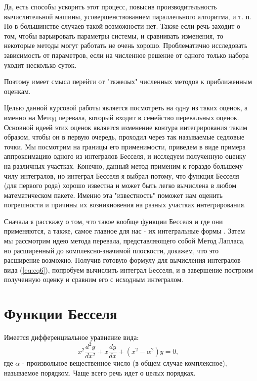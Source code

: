 \documentclass[14pt]{extarticle}
\begin{document}
Да, есть способы ускорить этот процесс, повысив производительность вычислительной машины, усовершенствованием параллельного алгоритма, и т. п. Но в большинстве случаев такой возможности нет. Также если речь заходит о том, чтобы варьировать параметры системы, и сравнивать изменения, то некоторые методы могут работать не очень хорошо. Проблематично исследовать зависимость от параметров, если на численное решение от одного только набора уходит несколько суток. 

Поэтому имеет смысл перейти от "тяжелых" численных методов к приближенным оценкам.

Целью данной курсовой работы является посмотреть на одну из таких оценок, а именно на Метод перевала, который входит в семейство перевальных оценок. Основной идеей этих оценок является изменение контура интегрирования таким образом, чтобы он в первую очередь, проходил через так называемые седловые точки. Мы посмотрим на границы его применимости, приведем в виде примера аппроксимацию одного из интегралов Бесселя, и исследуем полученную оценку на различных участках. Конечно, данный метод применим к гораздо большему чилу интегралов, но интеграл Бесселя я выбрал потому, что функция Бесселя (для первого рода) хорошо известна и может быть легко вычислена в любом математическом пакете. Именно эта "известность" поможет нам оценить погрешности и причины их возникновения на разных участках интегрирования. 

Сначала я расскажу о том, что такое вообще функции Бесселя и где они применяются, а также, самое главное для нас - их интегральные формы . Затем мы рассмотрим идею метода перевала, представляющего собой Метод Лапласа, но расширенный до комплексно-значимой плоскости, докажем, что это расширение возможно. Получив готовую формулу для вычисления интегралов вида (\ref{eq:eq6}), попробуем вычислить интеграл Бесселя, и в завершение построим полученную оценку и сравним его с исходным интегралом. 


\section{Функции Бесселя}
Имеется дифференциальное уравнение вида:
\begin{equation}\label{eq:eq4}
x^2\frac{d^2 y}{dx^2}+x\frac{dy}{dx}+(x^2-\alpha^2)y = 0,
\end{equation}
где $\alpha$ - произвольное вещественное число (в общем случае комплексное), называемое порядком. Чаще всего речь идет о целых порядках.
\end{document}
